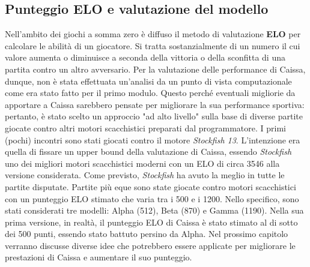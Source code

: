 \subsection{Punteggio ELO e valutazione del modello}
Nell'ambito dei giochi a somma zero è diffuso il metodo di valutazione \textbf{ELO} per calcolare le abilità di un giocatore. Si tratta sostanzialmente di un numero il cui valore aumenta o diminuisce a seconda della vittoria o della sconfitta di una partita contro un altro avversario.
Per la valutazione delle performance di Caissa, dunque, non è stata effettuata un'analisi da un punto di vista computazionale come era stato fatto per il primo modulo. Questo perché eventuali migliorie da apportare a Caissa sarebbero pensate per migliorare la sua performance sportiva: pertanto, è stato scelto un approccio "ad alto livello" sulla base di diverse partite giocate contro altri motori scacchistici preparati dal programmatore. I primi (pochi) incontri sono stati giocati contro il motore \textit{Stockfish 13}. L'intenzione era quella di fissare un upper bound della valutazione di Caissa, essendo \textit{Stockfish} uno dei migliori motori scacchistici moderni con un ELO di circa 3546 alla versione considerata. 
Come previsto, \textit{Stockfish} ha avuto la meglio in tutte le partite disputate. Partite più eque sono state giocate contro motori scacchistici con un punteggio ELO stimato che varia tra i 500 e i 1200. Nello specifico, sono stati considerati tre modelli: Alpha (512), Beta (870) e Gamma (1190). Nella sua prima versione, in realtà, il punteggio ELO di Caissa è stato stimato al di sotto dei 500 punti, essendo stato battuto persino da Alpha. Nel prossimo capitolo verranno discusse diverse idee che potrebbero essere applicate per migliorare le prestazioni di Caissa e aumentare il suo punteggio.



\newpage
